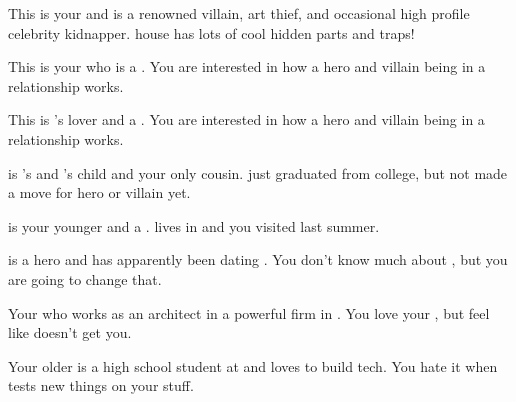 \documentclass[char]{LRSguildcamp1}
\begin{document}
\begin{contacts}
	\contact{\cGrandma{}} This is your \cGrandma{\grandparent} and is a renowned villain, art thief, and occasional high profile celebrity kidnapper. \cGrandma{\Their} house has lots of cool hidden parts and traps!
	
	\contact{\cOldest{}} This is your \cOldest{\uncle} who is a \cOldest{\villain}.  You are interested in how a hero and villain being in a relationship works. 
	
	\contact{\cOS{}} This is \cOldest{}'s lover and a \cOS{\hero}. You are interested in how a hero and villain being in a relationship works. 
	
	\contact{\cGrad{}} \cGrad{} is \cOldest{}'s and \cOS{}'s child and your only cousin. \cGrad{\They} just graduated from college, but \cGrad{\have} not made a move for hero or villain yet. 
	
	\contact{\cYoungest{}} \cYoungest{} is your younger \cYoungest{\uncle} and a \cYoungest{\hero}. \cYoungest{} lives in \pCityYoungest{} and you visited \cYoungest{\them} last summer.  
	
	\contact{\cYS{}} \cYS{} is a hero and has apparently been dating \cYoungest{}. You don't know much about \cYS{\them}, but you are going to change that. 
	
	\contact{\cArchitect{}} Your \cArchitect{\parent} who works as an architect in a powerful firm in \pCityArchitect{}.  You love your \cArchitect{\parent}, but feel like \cArchitect{\they} doesn't get you. 
	
	 	\contact{\cTeen{}} Your older \cTeen{\sibling} is a high school student at \pNormalSchool{} and loves to build tech. You hate it when \cTeen{} tests new things on your stuff. 
		
\end{contacts}
\end{document}
